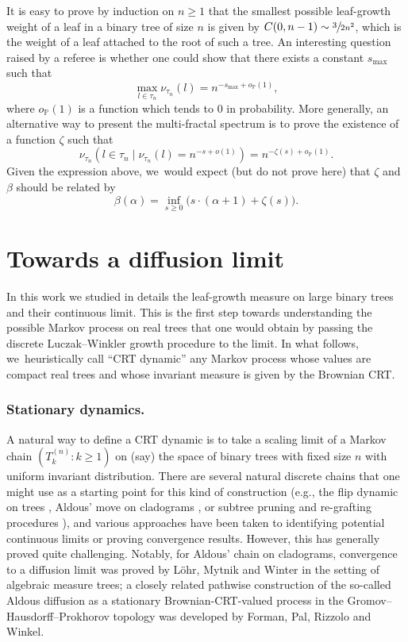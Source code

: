 \begin{rem}\label{rem:multi-fractal}It is easy to prove by induction on $n \geq 1$ that the smallest possible leaf-growth weight of a leaf in a binary tree of size $n$ is given by $C(0,n-1) \sim \sfrac{3}{2 n^2}$, which is the weight of a leaf attached to the root of such a tree. An interesting question raised by a referee is whether one could show that there exists a constant $s_{\max}$ such that
\[
\max_{l \in \tau_n} \nu_{\tau_n}(l) = n^{-s_{\max} + o_{\mathbb{P}}(1)},
\]
where $o_{\mathbb{P}}(1)$ is a function which tends to $0$ in probability. More generally, an alternative way to present the multi-fractal spectrum is to prove the existence of a function $\zeta$ such that
\[
\nu_{\tau_n}(l \in \tau_n \mid \nu_{\tau_n}(l) = n^{-s+o(1)}) = n^{-\zeta(s)+o_{\mathbb{P}}(1)}.
\]
Given the expression above, we~would expect (but do not prove here) that $\zeta$ and $\beta$ should be related by
\[
\beta(\alpha) = \inf_{s \geq 0} \big(s\cdot (\alpha+1) + \zeta(s)\big).
\]
\end{rem}

\section{Towards a diffusion limit}
In this work we studied in details the leaf-growth measure on large binary trees and their continuous limit. This is the first step towards understanding the possible Markov process on real trees that one would obtain by passing the discrete Luczak--Winkler growth procedure to the limit. In what follows, we~heuristically call ``CRT dynamic'' any Markov process whose values are compact real trees and whose invariant measure is given by the Brownian CRT.

\subsubsection*{Stationary dynamics.} A natural way to define a CRT dynamic is to take a scaling limit of a Markov chain $(T^{(n)}_k : k \geq 1)$ on (say) the space of binary trees with fixed size $n$ with uniform invariant distribution. There are several natural discrete chains that one might use as a starting point for this kind of construction (e.g., the flip dynamic on trees \cite{mcshine1997mixing}, Aldous' move on cladograms \cite{lohr2020aldous,forman2023aldous}, or subtree pruning and re-grafting procedures \cite{EW06}), and various approaches have been taken to identifying potential continuous limits or proving convergence results. However, this has generally proved quite challenging. Notably, for Aldous' chain on cladograms, convergence to a diffusion limit was proved by Löhr, Mytnik and Winter in the setting of algebraic measure trees; a closely related pathwise construction of the so-called Aldous diffusion as a stationary Brownian-CRT-valued process in the Gromov–Hausdorff–Prokhorov topology was developed by Forman, Pal, Rizzolo and Winkel.

